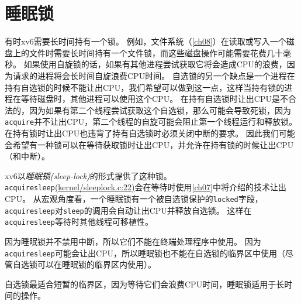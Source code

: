 \section{睡眠锁}
有时xv6需要长时间持有一个锁。
例如，文件系统（\autoref{ch08}）在读取或写入一个磁盘上的文件时需要长时间持有一个文件锁，而这些磁盘操作可能需要花费几十毫秒。
如果使用自旋锁的话，如果有其他进程尝试获取它将会造成CPU的浪费，因为请求的进程将会长时间自旋浪费CPU时间。
自选锁的另一个缺点是一个进程在持有自选锁的时候不能让出CPU，我们希望可以做到这一点，这样当持有锁的进程在等待磁盘时，其他进程可以使用这个CPU。
在持有自选锁时让出CPU是不合法的，因为如果有第二个线程尝试获取这个自选锁，那么可能会导致死锁，因为\texttt{acquire}并不让出CPU，第二个线程的自旋可能会阻止第一个线程运行和释放锁。
在持有锁时让出CPU也违背了持有自选锁时必须关闭中断的要求。
因此我们可能会希望有一种锁可以在等待获取锁时让出CPU，并允许在持有锁的时候让出CPU（和中断）。

xv6以\emph{睡眠锁(sleep-lock)}的形式提供了这种锁。
\texttt{acquiresleep}\href{https://github.com/mit-pdos/xv6-riscv/blob/riscv//kernel/sleeplock.c#L22}{(kernel/sleeplock.c:22)}会在等待时使用\autoref{ch07}中将介绍的技术让出CPU。
从宏观角度看，一个睡眠锁有一个被自选锁保护的\texttt{locked}字段，\texttt{acquiresleep}对\texttt{sleep}的调用会自动让出CPU并释放自选锁。
这样在\texttt{acquiresleep}等待时其他线程可移植性。

因为睡眠锁并不禁用中断，所以它们不能在终端处理程序中使用。
因为\texttt{acquiresleep}可能会让出CPU，所以睡眠锁也不能在自选锁的临界区中使用（尽管自选锁可以在睡眠锁的临界区内使用）。

自选锁最适合短暂的临界区，因为等待它们会浪费CPU时间，睡眠锁适用于长时间的操作。


